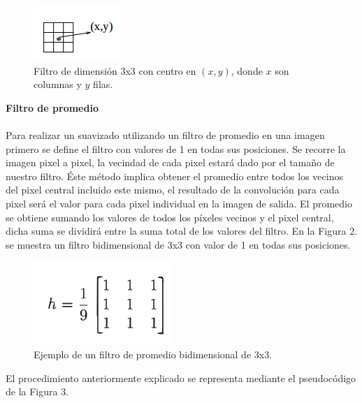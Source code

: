\documentclass[conference]{IEEEtran}
\begin{document}
\begin{figure}[h]
	\begin{center}
		\setlength{\unitlength}{0.00105in}
		\includegraphics[scale=0.75]{./images/vecinos.png}
	\end{center}
	\caption{Filtro de dimensi\'on 3x3 con centro en $(x,y)$, donde $x$ son columnas y $y$ filas. }
\end{figure}

\newpage
\textbf{Filtro de promedio\\\\}
Para realizar un suavizado utilizando un filtro de promedio en una imagen primero se define el filtro con valores de 1 en todas sus posiciones. Se recorre la imagen pixel a pixel, la vecindad de cada pixel estar\'a dado por el tama\~no de nuestro filtro. \'Este m\'etodo implica obtener el promedio entre todos los vecinos del pixel central incluido este mismo, el resultado de la convoluci\'on para cada pixel ser\'a el valor para cada pixel individual en la imagen de salida. El promedio se obtiene sumando los valores de todos los p\'ixeles vecinos y el pixel central, dicha suma se dividir\'a entre la suma total de los valores del filtro. En la Figura 2. se muestra un filtro bidimensional de 3x3 con valor de 1 en todas sus posiciones.

\begin{figure}[h]
	\begin{center}
		\setlength{\unitlength}{0.00105in}
		\includegraphics[scale=0.50]{./images/filtro.png}
	\end{center}
	\caption{Ejemplo de un filtro de promedio bidimensional de 3x3.}
\end{figure}

El procedimiento anteriormente explicado se representa mediante el pseudoc\'odigo de la Figura 3.\\
\end{document}
